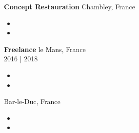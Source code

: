 \documentclass[a4paper]{article}
\newcommand\en[1]{}
\newcommand\fr[1]{}
\begin{document}
    \textbf{Concept Restauration}
        \hfill Chambley, France\\
        \en{ \textit{Service worker} \hfill Summer of 2019\\}
        \fr{ \textit{Personnel de service} \hfill été 2019\\}
        \vspace{-1mm}
        \begin{itemize} \itemsep 1pt
            \item
                \en{set up, cooking, inventory management}
                \fr{Mise en place, cuisine, gestion des stocks}
            \item
                \en{Work in difficult situations, stress management}
                \fr{Travail en situation difficiles, gestion du stress}
        \end{itemize}

    \textbf{Freelance}
        \hfill le Mans, France\\
        \en{ \textit{Web development}}
        \fr{ \textit{Développement web}}
        \hfill 2016 | 2018\\
        \vspace{-1mm}
        \begin{itemize} \itemsep 1pt
            \item
                \en{Creation of designs in accordance to the will of the clients}
                \fr{Relations clientèle}
            \item
                \en{Deadline estimation, programming and server management}
                \fr{Estimation de deadlines, programmation et gestion de serveurs}
        \end{itemize}

    \en{\textbf{General Hospital}}
    \fr{\textbf{Hôpital Général}}
        \hfill Bar-le-Duc, France\\
        \en{\textit{IT Assistant Intern} \hfill May of 2015\\}
        \fr{\textit{Stage Assistant IT} \hfill mai 2015\\}
        \vspace{-1mm}
        \begin{itemize} \itemsep 1pt
            \item
                \en{Set up and maintenance of the computer hardware}
                \fr{Mise en place et réparation du matériel informatique}
            \item
                \en{Help hospital staff with hardware and software issues}
                \fr{Assistance à l'utilisation du matériel et des applications}
        \end{itemize}
\end{document}
